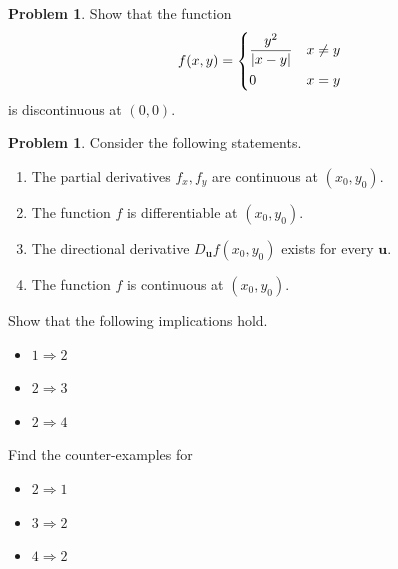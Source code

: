 \documentclass{beamer}
\theoremstyle{plain}
\theoremstyle{definition}
\newtheorem{prob}[thm]{Problem}
\begin{document}
\begin{frame}
\begin{prob}
	Show that the function
	$$f(x,y)=\begin{dcases}
	\frac{y^2}{|x-y|} & x\neq y\\
	0 & x=y\end{dcases}$$
	is discontinuous at $(0,0)$.
\end{prob}	
\end{frame}

\begin{frame}
\begin{prob}
	Consider the following statements.
	\begin{enumerate}
		\item The partial derivatives $f_x,f_y$ are continuous at $(x_0,y_0)$.
		\item The function $f$ is differentiable at $(x_0,y_0)$.
		\item The directional derivative $D_{\mathbf u}f(x_0,y_0)$ exists for every $\mathbf u$.
		\item The function $f$ is continuous at $(x_0,y_0)$.
	\end{enumerate}
	Show that the following implications hold.
	\begin{itemize}
		\item $1\Rightarrow 2$
		\item $2\Rightarrow 3$
		\item $2\Rightarrow 4$
	\end{itemize}
	Find the counter-examples for 
	\begin{itemize}
		\item $2\Rightarrow 1$
		\item $3\Rightarrow 2$
		\item $4\Rightarrow 2$
	\end{itemize}
\end{prob}	
\end{frame}
\end{document}

